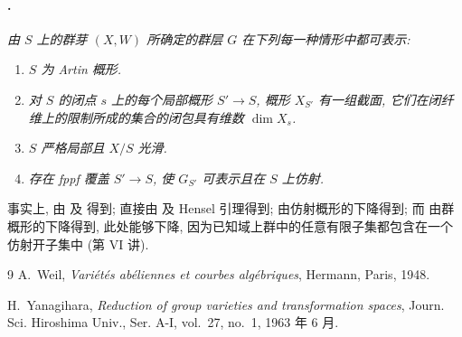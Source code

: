 \paragraph{.}
\textit{由 \(S\) 上的群芽 \((X,W)\) 所确定的群层 \(G\)
在下列每一种情形中都可表示:}
\begingroup
\renewcommand{\labelenumi}{\textup{(\roman{enumi})}}
\begin{enumerate}
\item{} \textit{\(S\) 为 Artin 概形.}
\item{} \textit{对 \(S\) 的闭点 \(s\) 上的每个局部概形 \(S'\to S\),
概形 \(X_{S'}\) 有一组截面,
它们在闭纤维上的限制所成的集合的闭包具有维数 \(\dim X_s\).}
\item{}
\textit{\(S\) 严格局部且 \(X/S\) 光滑.}
\item{} \textit{存在 fppf 覆盖 \(S'\to S\),
使 \(G_{S'}\) 可表示且在 \(S\) 上仿射.}
\end{enumerate}
\endgroup

事实上, 
由 及 得到;
直接由 及 Hensel 引理得到;
 由仿射概形的下降得到;
而 由群概形的下降得到,
此处能够下降, 因为已知域上群中的任意有限子集都包含在一个仿射开子集中 (第 VI 讲).

\begin{thebibliography}{9}
A.~Weil,
\emph{Variétés abéliennes et courbes algébriques},
Hermann, Paris, 1948.

H.~Yanagihara,
\emph{Reduction of group varieties and transformation spaces},
Journ. Sci. Hiroshima Univ., Ser. A-I, vol.~27, no.~1,
1963 年 6 月.
\end{thebibliography}
